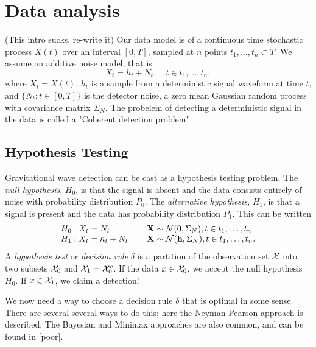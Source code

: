 


\chapter{Data analysis}           
(This intro sucks, re-write it) Our data model is of a continuous time stochastic process $X(t)$ over an interval $[0,T]$, sampled at $n$ points ${t_1, \ldots, t_n} \subset T$. We assume an additive noise model, that is 
\begin{equation}
X_t=h_t+N_t, \hspace{12pt} t\in {t_1, \ldots, t_n}  ,
\end{equation}
where $X_t=X(t)$, $h_t$ is a sample from a deterministic signal waveform at time $t$, and $\{N_t: t \in [0,T]\}$ is the detector noise, a zero mean Gaussian random process with covariance matrix $\Sigma_N$. The probelem of detecting a deterministic signal in the data is called a "Coherent detection problem"


\section{Hypothesis Testing}
Gravitational wave detection can be cast as a hypothesis testing problem. The \textit{null hypothesis}, $H_0$, is that the signal is absent and the data consists entirely of noise with probability distribution $P_0$. The \textit{alternative hypothesis}, $H_1$, is that a signal is present and the data has probability distribution $P_1$. This can be written
\begin{equation}
\label{eq:hyppair}
\begin{array}{ll}
H_0: X_t = N_t &\hspace{12pt} \mathbf{X} \sim \mathcal{N}(0,\Sigma_N),  t\in {t_1, \ldots, t_n} \\
H_1: X_t = h_t + N_t &\hspace{12pt} \mathbf{X} \sim \mathcal{N}(\mathbf{h}, \Sigma_N),  t\in {t_1, \ldots, t_n}. 
\end{array}
\end{equation}
A \textit{hypothesis test} or \textit{decision rule} $\delta$ is a partition of the observation set $\mathcal{X}$ into two subsets $\mathcal{X}_0$ and $\mathcal{X}_1=\mathcal{X}_0^c$. If the data  $x \in \mathcal{X}_0$, we accept the null hypothesis $H_0$. If $x \in \mathcal{X}_1$, we claim a detection!

We now need a way to choose a decision rule $\delta$ that is optimal in some sense. There are several several ways to do this; here the Neyman-Pearson approach is described. The Bayesian and Minimax approaches are also common, and can be found in [poor].

